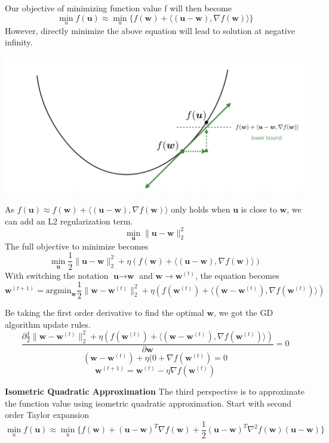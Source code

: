 \documentclass[11pt]{article}
\begin{document}
Our objective of minimizing function value f will then become
$$\min_u f(\textbf{u}) \approx \min_u \{f(\textbf{w}) + \langle (\textbf{u} - \textbf{w}), \nabla f(\textbf{w}) \rangle\}$$
However, directly minimize the above equation will lead to solution at negative infinity.
\begin{center}
    \hspace{3cm}\includegraphics[scale=0.4]{images/gd_perspect2.png}
\end{center}


As $f(\textbf{u}) \approx f(\textbf{w}) + \langle (\textbf{u} - \textbf{w}), \nabla f(\textbf{w}) \rangle$ only holds when $\textbf{u}$ is close to $\textbf{w}$, we can add an L2 regularization term. 
$$\min_\textbf{u} \|\textbf{u}  - \textbf{w}\|_2^2$$
The full objective to minimize becomes
$$\min_\textbf{u} \frac{1}{2}\|\textbf{u}  - \textbf{w}\|_2^2 + \eta(f(\textbf{w}) + \langle (\textbf{u} - \textbf{w}), \nabla f(\textbf{w}) \rangle)$$
With switching the notation $\textbf{u} \rightarrow \textbf{w}$ and $\textbf{w} \rightarrow \textbf{w}^{(t)}$, the equation becomes
$$\textbf{w}^{(t+1)} = \text{argmin}_{\textbf{w}}\frac{1}{2}\|\textbf{w}  - \textbf{w}^{(t)}\|_2^2 + \eta(f(\textbf{w}^{(t)}) + \langle (\textbf{w} - \textbf{w}^{(t)}), \nabla f(\textbf{w}^{(t)}) \rangle)$$

Be taking the first order derivative to find the optimal $\textbf{w}$, we got the GD algorithm update rules.
$$\frac{\partial \frac{1}{2}\|\textbf{w}  - \textbf{w}^{(t)}\|_2^2 + \eta(f(\textbf{w}^{(t)}) + \langle (\textbf{w} - \textbf{w}^{(t)}), \nabla f(\textbf{w}^{(t)}) \rangle)}{\partial \textbf{w}} = 0$$
$$(\textbf{w}  - \textbf{w}^{(t)}) + \eta(0 + \nabla f(\textbf{w}^{(t)}) = 0$$
$$\textbf{w}^{(t+1)} = \textbf{w}^{(t)} - \eta \nabla f(\textbf{w}^{(t)})$$

\textbf{Isometric Quadratic Approximation  }
The third perspective is to approximate the function value using isometric quadratic approximation. Start with second order Taylor expansion
$$\min_u f(\textbf{u}) \approx \min_u \{f(\textbf{w}) + (\textbf{u} - \textbf{w})^T\nabla f(\textbf{w}) + \frac{1}{2}(\textbf{u} - \textbf{w})^T\nabla^2 f(\textbf{w})(\textbf{u} - \textbf{w})\}$$
\end{document}
